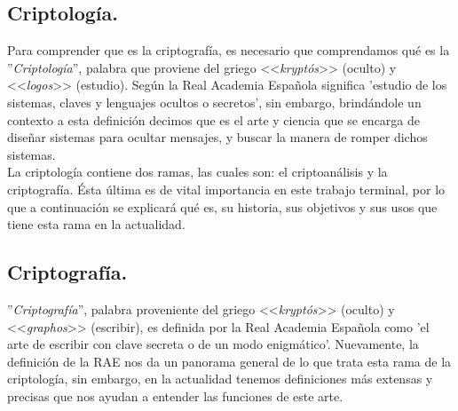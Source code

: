\documentclass[12pt, a4paper, titlepage]{report}
\begin{document}
	        \subsection{Criptología.}
	            Para comprender que es la criptografía, es necesario que comprendamos qué es la ''\textit{Criptología}'', palabra que proviene del griego <<\textit{kryptós}>> (oculto) y <<\textit{logos}>> (estudio). Según la Real Academia Española significa 'estudio de los sistemas, claves y lenguajes ocultos o secretos', sin embargo, brindándole un contexto a esta definición decimos que es el arte y ciencia que se encarga de diseñar sistemas para ocultar mensajes, y buscar la manera de romper dichos sistemas. \cite{refCriptology}\\
	            La criptología contiene dos ramas, las cuales son: el criptoanálisis y la criptografía. Ésta última es de vital importancia en este trabajo terminal, por lo que a continuación se explicará qué es, su historia, sus objetivos y sus usos que tiene esta rama en la actualidad.
            \subsection{Criptografía.}
                ''\textit{Criptografía}'', palabra proveniente del griego <<\textit{kryptós}>> (oculto) y <<\textit{graphos}>> (escribir), es definida por la Real Academia Española como 'el arte de escribir con clave secreta o de un modo enigmático'. Nuevamente, la definición de la RAE nos da un panorama general de lo que trata esta rama de la criptología, sin embargo, en la actualidad tenemos definiciones más extensas y precisas que nos ayudan a entender las funciones de este arte.\\
                
\end{document}
